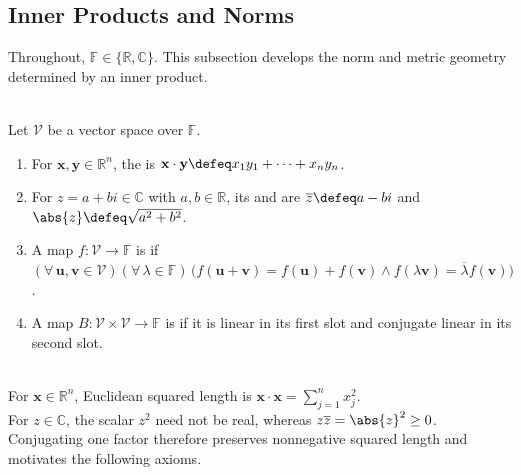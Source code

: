 \subsection{Inner Products and Norms}

%

Throughout, $\mathbb{F}\in\{\mathbb{R},\mathbb{C}\}$. This subsection develops the norm and metric geometry determined by an inner product.

\begin{definition} \label{def:inner-product-preliminary-terminology} \\
Let $\mathcal{V}$ be a vector space over $\mathbb{F}$.
\begin{enumerate}[label=(\roman*)]
\setlength{\itemsep}{0pt}
\item For $\mathbf{x},\mathbf{y}\in\mathbb{R}^n$, the  is $\mathbf{x}\cdot\mathbf{y}\defeq x_1y_1+\cdots+x_ny_n$.
\item For $z=a+bi\in\mathbb{C}$ with $a,b\in\mathbb{R}$, its  and  are $\overline{z}\defeq a-bi$ and $\abs{z}\defeq\sqrt{a^2+b^2}$.
\item A map $f:\mathcal{V}\to\mathbb{F}$ is  if $(\forall\,\mathbf{u},\mathbf{v}\in\mathcal{V})(\forall\,\lambda\in\mathbb{F})\,\bigl(f(\mathbf{u}+\mathbf{v})=f(\mathbf{u})+f(\mathbf{v})\land f(\lambda\mathbf{v})=\overline{\lambda}f(\mathbf{v})\bigr)$.
\item A map $B:\mathcal{V}\times\mathcal{V}\to\mathbb{F}$ is  if it is linear in its first slot and conjugate linear in its second slot.
\end{enumerate}
\end{definition}

\begin{motivation} \label{mot:inner-product-from-dot-product} \\
For $\mathbf{x}\in\mathbb{R}^n$, Euclidean squared length is $\mathbf{x}\cdot\mathbf{x}=\sum\limits_{j=1}^{n}x_j^2$.\\
For $z\in\mathbb{C}$, the scalar $z^2$ need not be real, whereas $z\overline{z}=\abs{z}^2\geq0$.\\
Conjugating one factor therefore preserves nonnegative squared length and motivates the following axioms.
\end{motivation}

